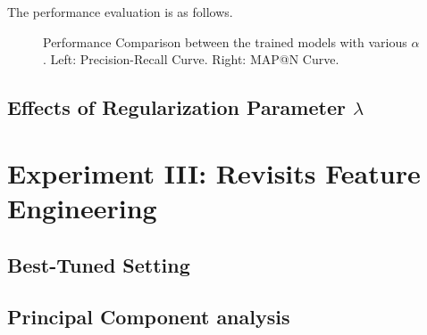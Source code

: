 \documentclass{article} %
\begin{document}
The performance evaluation is as follows.
\begin{figure}[hp]
    \centering
    \captionsetup{justification=centering}
    \caption{Performance Comparison between the trained models with various
        $\alpha$.  Left: Precision-Recall Curve. Right: MAP@N Curve. }
    \label{EffectK:RP_MAP}
\end{figure}

\newpage
\subsection{Effects of Regularization Parameter $\lambda$}


\newpage
\section{Experiment III: Revisits Feature Engineering}

\subsection{Best-Tuned Setting}

\subsection{Principal Component analysis}
\end{document}
